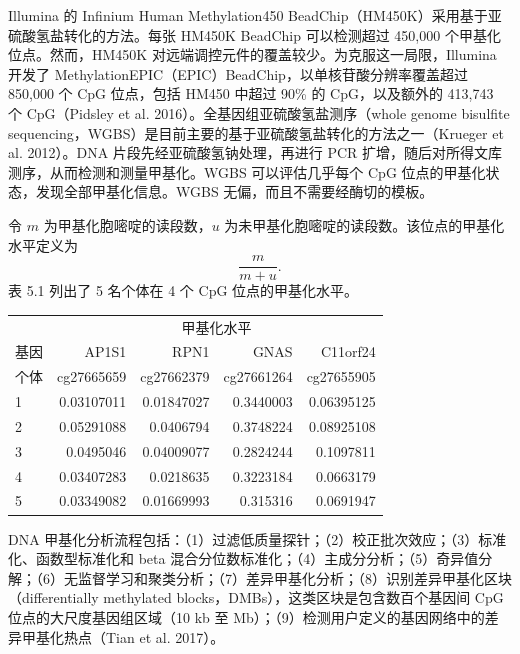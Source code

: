 

Illumina 的 Infinium Human Methylation450 BeadChip（HM450K）采用基于亚硫酸氢盐转化的方法。每张 HM450K BeadChip 可以检测超过 450,000 个甲基化位点。然而，HM450K 对远端调控元件的覆盖较少。为克服这一局限，Illumina 开发了 MethylationEPIC（EPIC）BeadChip，以单核苷酸分辨率覆盖超过 850,000 个 CpG 位点，包括 HM450 中超过 90\% 的 CpG，以及额外的 413,743 个 CpG（Pidsley et al. 2016）。全基因组亚硫酸氢盐测序（whole genome bisulfite sequencing，WGBS）是目前主要的基于亚硫酸氢盐转化的方法之一（Krueger et al. 2012）。DNA 片段先经亚硫酸氢钠处理，再进行 PCR 扩增，随后对所得文库测序，从而检测和测量甲基化。WGBS 可以评估几乎每个 CpG 位点的甲基化状态，发现全部甲基化信息。WGBS 无偏，而且不需要经酶切的模板。

令 $m$ 为甲基化胞嘧啶的读段数，$u$ 为未甲基化胞嘧啶的读段数。该位点的甲基化水平定义为
\[
\frac{m}{m+u}.
\]
表 5.1 列出了 5 名个体在 4 个 CpG 位点的甲基化水平。

\begin{table}[htbp]
\centering
{}
\label{tab:ch05-methylation-example}
\small
\setlength{\tabcolsep}{5pt}
\begin{tabular*}{\textwidth}{@{\extracolsep{\fill}}lrrrr@{}}
\toprule
 & \multicolumn{4}{c}{甲基化水平} \\
基因 & AP1S1 & RPN1 & GNAS & C11orf24 \\
个体 & cg27665659 & cg27662379 & cg27661264 & cg27655905 \\
\midrule
1 & 0.03107011 & 0.01847027 & 0.3440003 & 0.06395125 \\
2 & 0.05291088 & 0.0406794 & 0.3748224 & 0.08925108 \\
3 & 0.0495046 & 0.04009077 & 0.2824244 & 0.1097811 \\
4 & 0.03407283 & 0.0218635 & 0.3223184 & 0.0663179 \\
5 & 0.03349082 & 0.01669993 & 0.315316 & 0.0691947 \\
\bottomrule
\end{tabular*}
\end{table}

DNA 甲基化分析流程包括：（1）过滤低质量探针；（2）校正批次效应；（3）标准化、函数型标准化和 beta 混合分位数标准化；（4）主成分分析；（5）奇异值分解；（6）无监督学习和聚类分析；（7）差异甲基化分析；（8）识别差异甲基化区块（differentially methylated blocks，DMBs），这类区块是包含数百个基因间 CpG 位点的大尺度基因组区域（10 kb 至 Mb）；（9）检测用户定义的基因网络中的差异甲基化热点（Tian et al. 2017）。

